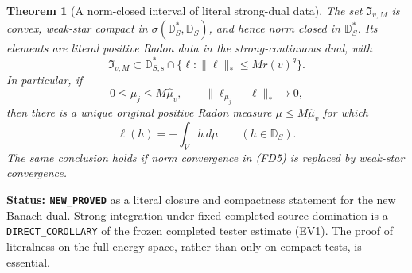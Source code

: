 \documentclass[11pt,a4paper]{article}
\numberwithin{equation}{section}
\newtheorem{theorem}{Theorem}[section]
\theoremstyle{definition}
\theoremstyle{remark}
\begin{document}
\begin{theorem}[A norm-closed interval of literal strong-dual data]
\label{thm:r12-fixed-domination-literal-closure}
The set $\mathfrak I_{v,M}$ is convex, weak-star compact in
$\sigma(\mathbb D_S^*,\mathbb D_S)$, and hence norm closed in
$\mathbb D_S^*$. Its elements are literal positive Radon data
in the strong-continuous dual, with
\[
 \mathfrak I_{v,M}\subset\mathbb D_{S,\mathrm s}^*\cap
       \{\ell:\|\ell\|_*\leq M r(v)^q\}.
 \tag{FD4}
\]
In particular, if
\[
 0\leq\mu_j\leq M\widehat\mu_v,\qquad
       \|\ell_{\mu_j}-\ell\|_*\longrightarrow0,
 \tag{FD5}
\]
then there is a unique original positive Radon measure
$\mu\leq M\widehat\mu_v$ for which
\[
                    \ell(h)=-\int_Vh\,d\mu
                       \qquad(h\in\mathbb D_S).
 \tag{FD6}
\]
The same conclusion holds if norm convergence in
\textup{(FD5)} is replaced by weak-star convergence.
\end{theorem}

\noindent\textbf{Status: \texttt{NEW\_PROVED}} as a literal
closure and compactness statement for the new Banach dual.
Strong integration under fixed completed-source domination is a
\texttt{DIRECT\_COROLLARY} of the frozen completed tester
estimate \textup{(EV1)}. The proof of literalness on the full
energy space, rather than only on compact tests, is essential.
\end{document}
